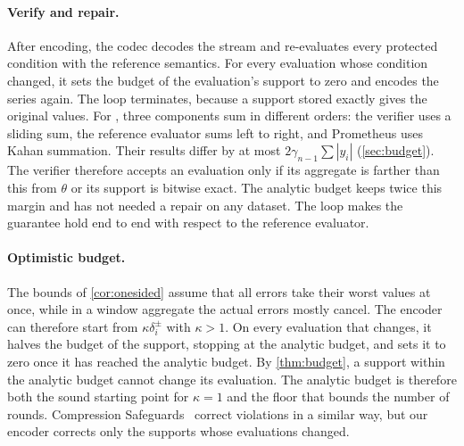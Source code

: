 \paragraph{Verify and repair.} After encoding, the codec decodes the
stream and re-evaluates every protected condition with the reference
semantics. For every evaluation whose condition changed, it sets the
budget of the evaluation's support to zero and encodes the series again.
The loop terminates, because a support stored exactly gives the original
values. For , three components sum in different orders: the
verifier uses a sliding sum, the reference evaluator sums left to right,
and Prometheus uses Kahan summation. Their results differ by at most
$2\gamma_{n-1}\sum|y_i|$ (\cref{sec:budget}). The verifier therefore
accepts an evaluation only if its aggregate is farther than this from
$\theta$ or its support is bitwise exact. The analytic budget keeps twice
this margin and has not needed a repair on any dataset. The loop makes the
guarantee hold end to end with respect to the reference evaluator.

\paragraph{Optimistic budget.} The bounds of \cref{cor:onesided} assume
that all errors take their worst values at once, while in a window
aggregate the actual errors mostly cancel. The encoder can therefore start
from $\kappa\delta^\pm_i$ with $\kappa > 1$. On every evaluation that
changes, it halves the budget of the support, stopping at the analytic
budget, and sets it to zero once it has reached the analytic budget. By
\cref{thm:budget}, a support within the analytic budget cannot change its
evaluation. The analytic budget is therefore both the sound starting point
for $\kappa = 1$ and the floor that bounds the number of rounds. Compression
Safeguards~\cite{tyree2026safeguards} correct violations in a similar way,
but our encoder corrects only the supports whose evaluations changed.
